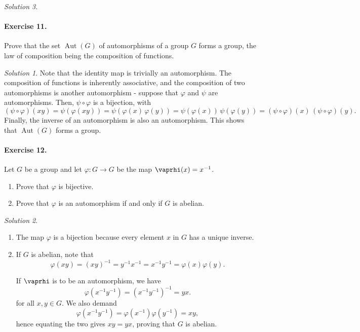 \documentclass[11pt]{report}
\DeclareMathOperator\aut{Aut}
\theoremstyle{remark}
\newtheorem*{solution}{Solution}
\begin{document}
\begin{solution}
    \paragraph{Exercise 11.} Prove that the set $\aut(G)$ of automorphisms of a
    group $G$ forms a group, the law of composition being the composition of
    functions.
    \begin{solution}
        Note that the identity map is trivially an automorphism. The composition of
        functions is inherently associative, and the composition of two
        automorphisms is another automorphism - suppose that $\varphi$ and $\psi$
        are automorphisms. Then, $\psi \circ \varphi$ is a bijection, with \[
            (\psi\circ\varphi)(xy) = \psi(\varphi(xy)) = \psi(\varphi(x)\,\varphi(y))
            = \psi(\varphi(x))\,\psi(\varphi(y)) =
            (\psi\circ\varphi)(x)\,(\psi\circ\varphi)(y).
        \] Finally, the inverse of an automorphism is also an automorphism. This
        shows that $\aut(G)$ forms a group.
    \end{solution}

    \paragraph{Exercise 12.} Let $G$ be a group and let $\varphi\colon G \to G$ be
    the map $\vaprhi(x) = x^{-1}$.
    \begin{enumerate}
        \itemsep0em 
        \item Prove that $\varphi$ is bijective.
        \item Prove that $\varphi$ is an automorphism if and only if $G$ is abelian.
    \end{enumerate}
    \begin{solution}
    \begin{enumerate}
        \item The map $\varphi$ is a bijection because every element $x$ in $G$ has
        a unique inverse.

        \item If $G$ is abelian, note that \[
            \varphi(xy) = (xy)^{-1} = y^{-1}x^{-1} = x^{-1}y^{-1} =
            \varphi(x)\varphi(y).
        \]

        If $\vaprhi$ is to be an automorphism, we have \[
            \varphi(x^{-1}y^{-1}) = (x^{-1}y^{-1})^{-1} = yx.
        \] for all $x, y \in G$. We also demand \[
            \varphi(x^{-1}y^{-1}) = \varphi(x^{-1})\varphi(y^{-1}) = xy,
        \] hence equating the two gives $xy = yx$, proving that $G$ is abelian.
    \end{enumerate}
    \end{solution}


\end{solution}
\end{document}
